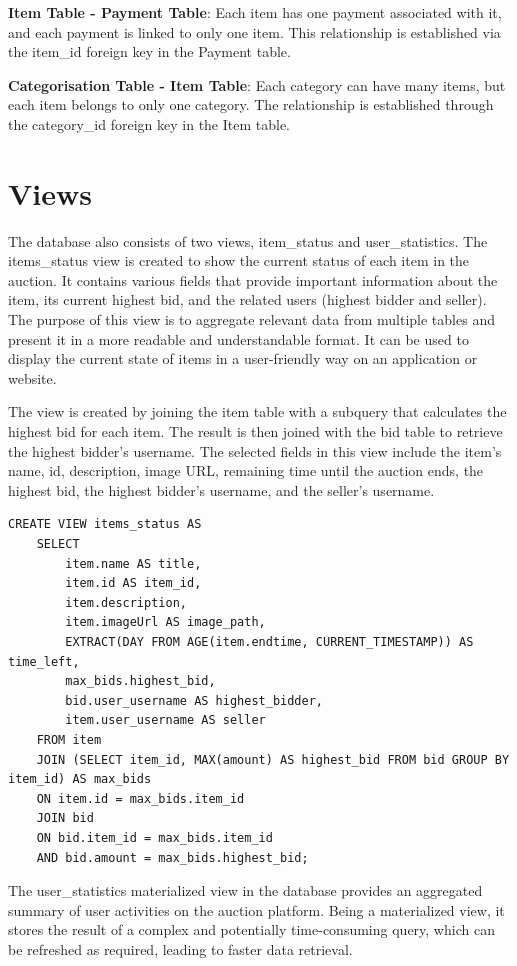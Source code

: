\textbf{Item Table - Payment Table}: Each item has one payment associated with it, and each payment is linked to only one item. This relationship is established via the item\_id foreign key in the Payment table.

\textbf{Categorisation Table - Item Table}: Each category can have many items, but each item belongs to only one category. The relationship is established through the category\_id foreign key in the Item table.


\section{Views}
The database also consists of two views, item\_status and user\_statistics.
The items\_status view is created to show the current status of each item in the auction. It contains various fields that provide important information about the item, its current highest bid, and the related users (highest bidder and seller). The purpose of this view is to aggregate relevant data from multiple tables and present it in a more readable and understandable format. It can be used to display the current state of items in a user-friendly way on an application or website.

The view is created by joining the item table with a subquery that calculates the highest bid for each item. The result is then joined with the bid table to retrieve the highest bidder's username. The selected fields in this view include the item's name, id, description, image URL, remaining time until the auction ends, the highest bid, the highest bidder's username, and the seller's username.
\begin{lstlisting}[style=sqlStyle]
	CREATE VIEW items_status AS
	SELECT 
		item.name AS title, 
		item.id AS item_id, 
		item.description, 
		item.imageUrl AS image_path,  
		EXTRACT(DAY FROM AGE(item.endtime, CURRENT_TIMESTAMP)) AS time_left,
		max_bids.highest_bid,
		bid.user_username AS highest_bidder,
		item.user_username AS seller
	FROM item 
	JOIN (SELECT item_id, MAX(amount) AS highest_bid FROM bid GROUP BY item_id) AS max_bids 
	ON item.id = max_bids.item_id
	JOIN bid
	ON bid.item_id = max_bids.item_id
	AND bid.amount = max_bids.highest_bid;
\end{lstlisting}

The user\_statistics materialized view in the database provides an aggregated summary of user activities on the auction platform. Being a materialized view, it stores the result of a complex and potentially time-consuming query, which can be refreshed as required, leading to faster data retrieval.

